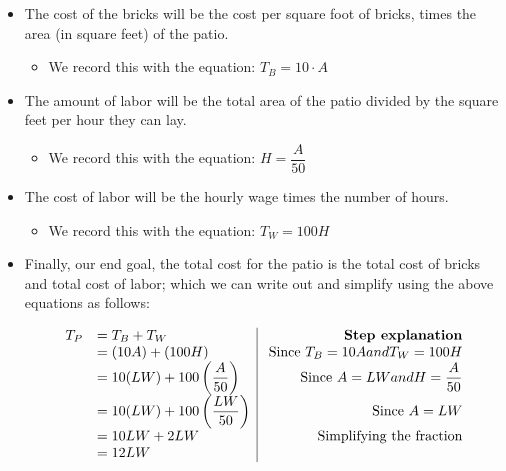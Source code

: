 \documentclass{ximeraXloud}
\begin{document}
\begin{example}
\begin{itemize}
            \item The cost of the bricks will be the cost per square foot of bricks, times the area (in square feet) of the patio.
            
            \begin{itemize}
                \item We record this with the equation: $T_B = 10 \cdot A$
            \end{itemize}
            
            \item The amount of labor will be the total area of the patio divided by the  square feet per hour they can lay.
            
            \begin{itemize}
                \item We record this with the equation: $H = \dfrac{A}{50}$
            \end{itemize}
            
            \item The cost of labor will be the hourly wage times the number of hours.
            
            \begin{itemize}
                \item We record this with the equation: $T_W = 100H$
            \end{itemize}
            
            \item Finally, our end goal, the total cost for the patio is the total cost of bricks and total cost of labor; which we can write out and simplify using the above equations as follows:
        
        \[
            \begin{array}{ll | r}
            T_P &= T_B + T_W & \text{ \textbf{Step explanation}}\\
            &= (10A) + (100H) & \text{ Since }T_B = 10A and T_W = 100H\\
            &= 10(LW) + 100\left(\dfrac{A}{50}\right) & \text{ Since }A = LW and H = \dfrac{A}{50}\\
            &= 10(LW) + 100\left(\dfrac{LW}{50}\right) & \text{ Since }A = LW\\
            &= 10LW + 2LW & \text{ Simplifying the fraction}\\
            &= 12LW
            \end{array}
        \]
        

\end{itemize}
\end{example}
\end{document}
